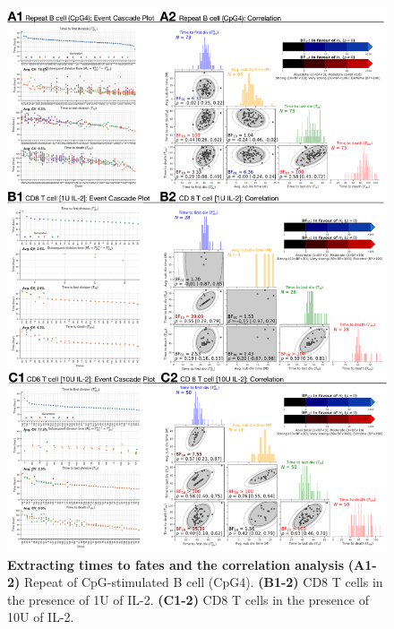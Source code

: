 \documentclass[11pt, a4paper]{article}
\begin{document}
\clearpage
\begin{figure}[H]
    \centering
    \includegraphics[scale=0.55]{figs/supp_fig2.pdf}
    \caption{\textbf{Extracting times to fates and the correlation analysis} \textbf{(A1-2)} Repeat of CpG-stimulated B cell (CpG4). \textbf{(B1-2)} CD8 T cells in the presence of 1U of IL-2. \textbf{(C1-2)} CD8 T cells in the presence of 10U of IL-2.}
    \label{supp_fig:repeats}
\end{figure}
\end{document}
